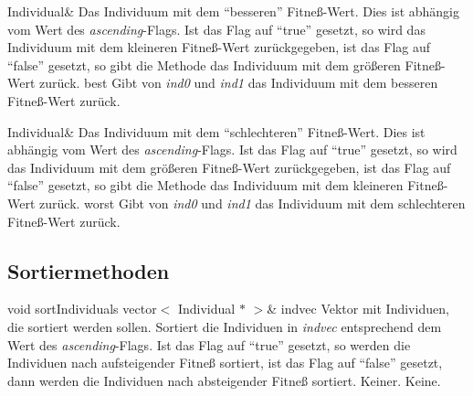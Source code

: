 \documentclass{report}
\begin{document}
\setConstInstance
\setCorrectWidthThree{8pt}
\printMethodWithParamsSaved
{Individual\&}
{Das Individuum mit dem ``besseren'' Fitne{\ss}-Wert. Dies ist
 abh\"angig vom Wert des {\em ascending}-Flags. Ist das Flag auf ``true''
 gesetzt, so wird das Individuum mit dem kleineren Fitne{\ss}-Wert 
 zur\"uckgegeben, ist das Flag auf ``false'' gesetzt, so gibt die Methode
 das Individuum mit dem gr\"o{\ss}eren Fitne{\ss}-Wert zur\"uck.}
{best}
{Gibt von {\em ind0} und {\em ind1} das Individuum mit dem besseren 
 Fitne{\ss}-Wert zur\"uck.}
{}
\setCorrectWidthThree{4pt}

\vspace{4ex}

\setConstInstance
\setCorrectWidthThree{8pt}
\printMethodWithParamsSaved
{Individual\&}
{Das Individuum mit dem ``schlechteren'' Fitne{\ss}-Wert. Dies ist
 abh\"angig vom Wert des {\em ascending}-Flags. Ist das Flag auf ``true''
 gesetzt, so wird das Individuum mit dem gr\"o{\ss}eren Fitne{\ss}-Wert 
 zur\"uckgegeben, ist das Flag auf ``false'' gesetzt, so gibt die Methode
 das Individuum mit dem kleineren Fitne{\ss}-Wert zur\"uck.}
{worst}
{Gibt von {\em ind0} und {\em ind1} das Individuum mit dem schlechteren
 Fitne{\ss}-Wert zur\"uck.}
{}
\setCorrectWidthThree{4pt}


\subsection{Sortiermethoden}

\setNormalInstance
\printMethodWithOneParam
{void}
{sortIndividuals}
{vector$<$ Individual $\ast$ $>$\&}
{indvec}
{Vektor mit Individuen, die sortiert
                             werden sollen.}
{Sortiert die Individuen in {\em indvec} entsprechend dem Wert des
 {\em ascending}-Flags. Ist das Flag auf ``true'' gesetzt, so 
 werden die Individuen nach aufsteigender Fitne{\ss} sortiert, ist das
 Flag auf ``false'' gesetzt, dann werden die Individuen nach absteigender
 Fitne{\ss} sortiert.}
{Keiner.}
{Keine.}
\end{document}
